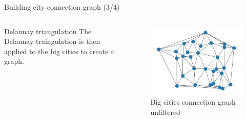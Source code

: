 \begin{frame}{Building city connection graph (3/4)}
    \begin{columns}
        \begin{column}{0.4\textwidth}
            \begin{block}{Delaunay triangulation}
                The Delaunay traingulation is then applied to the big cities to create a graph.
            \end{block}
        \end{column}
        \begin{column}{0.6\textwidth}
            \begin{figure}
                \includegraphics[height=0.3\paperheight]{images/road_detection/delaunay_big_cities_unfiltered.png}
                \caption{Big cities connection graph unfiltered}
            \end{figure}
        \end{column}
    \end{columns}        
\end{frame}

